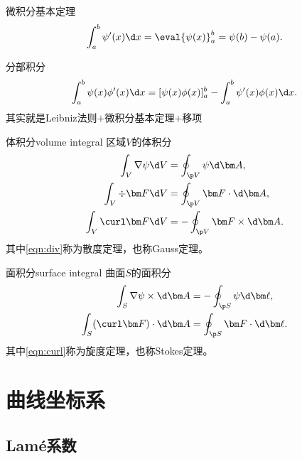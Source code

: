 \begin{compactitem}
	\item 微积分基本定理
	\begin{equation}
        \int_a^b\psi'(x)\d x=\eval{\psi(x)}_a^b=\psi(b)-\psi(a).
    \end{equation}
    \item 分部积分
    \begin{equation}
        \int_a^b\psi(x)\phi'(x)\d x=[\psi(x)\phi(x)]_a^b-\int_a^b\psi'(x)\phi(x)\d x.
    \end{equation}
    其实就是Leibniz法则$+$微积分基本定理$+$移项
\end{compactitem}

\begin{theorem}
    {体积分}{volume integral}
    区域$V$的体积分
    \begin{align}
        \int_V\nabla\psi\d V&=\oint_{\p V}\psi\d\bm A,\\
        \label{eqn:div}
        \int_V\div\bm F\d V&=\oint_{\p V}\bm F\cdot\d\bm A,\\
        \int_V\curl\bm F\d V&=-\oint_{\p V}\bm F\times\d\bm A.
    \end{align}
    其中\eqref{eqn:div}称为散度定理，也称Gauss定理。
\end{theorem}

\begin{theorem}
    {面积分}{surface integral}
    曲面$S$的面积分
    \begin{align}
        \int_S\nabla\psi\times\d\bm A&=-\oint_{\p S}\psi\d\bm\ell,\\
        \label{eqn:curl}
        \int_S(\curl\bm F)\cdot\d\bm A&=\oint_{\p S}\bm F\cdot\d\bm\ell.
    \end{align}
    其中\eqref{eqn:curl}称为旋度定理，也称Stokes定理。
\end{theorem}



\section{曲线坐标系}
\label{sec:curvilinear coordinates}

\subsection{Lam\'e系数}

